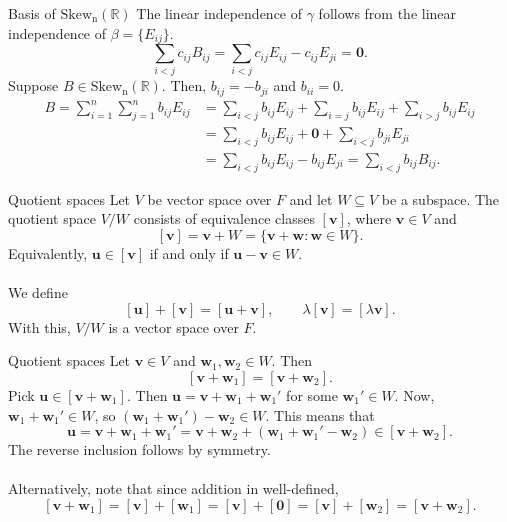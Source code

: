 \documentclass[handout]{beamer}
\def\Skew{\operatorname{Skew_n(\mathbb{R})}}
\def\u{\bm{u}}
\def\v{\bm{v}}
\def\w{\bm{w}}
\begin{document}
        \begin{frame}{Basis of $\Skew$}
                The linear independence of $\gamma$ follows from the linear independence of $\beta = \{E_{ij}\}$.
                \[
                        \sum_{i < j} c_{ij}B_{ij} = \sum_{i < j} c_{ij} E_{ij} - c_{ij}E_{ji} = \mathbf{0}.
                \]
                \pause
                Suppose $B \in \Skew$. Then, $b_{ij} = -b_{ji}$ and $b_{ii} = 0$.
                \begin{align*}
                        B = \sum_{i = 1}^n \sum_{j = 1}^n b_{ij}E_{ij} 
                                &= \sum_{i < j} b_{ij}E_{ij} + \sum_{i = j}b_{ij}E_{ij} + \sum_{i > j} b_{ij}E_{ij} \\
                                &= \sum_{i < j} b_{ij}E_{ij} + \mathbf{0} + \sum_{i < j} b_{ji}E_{ji} \\
                                &= \sum_{i < j} b_{ij}E_{ij} - b_{ij}E_{ji} = \sum_{i < j} b_{ij}B_{ij}.
                \end{align*}
        \end{frame}

        \begin{frame}{Quotient spaces}
                Let $V$ be vector space over $F$ and let $W\subseteq V$ be a subspace.
                The quotient space $V/W$ consists of equivalence classes $[\v]$, where $\v \in V$ and
                \[
                        [\v] = \v + W = \{\v + \w\colon \w \in W\}.
                \]
                Equivalently, $\u \in [\v]$ if and only if $\u - \v \in W$. \\~\\
                \pause
                We define
                \[
                        [\u] + [\v] = [\u + \v], \qquad \lambda[\v] = [\lambda\v].
                \]
                With this, $V/W$ is a vector space over $F$.
        \end{frame}
        
        \begin{frame}{Quotient spaces}
                Let $\v \in V$ and $\w_1, \w_2 \in W$. Then
                \[
                        [\v + \w_1] = [\v + \w_2].
                \]
                Pick $\u \in [\v + \w_1]$. Then $\u = \v + \w_1 + \w_1'$ for some $\w_1' \in W$. Now, $\w_1 + \w_1' \in W$,
                so $(\w_1 + \w_1') - \w_2 \in W$. This means that
                \[
                        \u = \v + \w_1 + \w_1' = \v + \w_2 + (\w_1 + \w_1' - \w_2) \in [\v + \w_2].
                \]
                The reverse inclusion follows by symmetry. \\~\\
                \pause
                Alternatively, note that since addition in well-defined,
                \[
                        [\v + \w_1] = [\v] + [\w_1] = [\v] + [\mathbf{0}] = [\v] + [\w_2] = [\v + \w_2].
                \]
        \end{frame}
\end{document}
